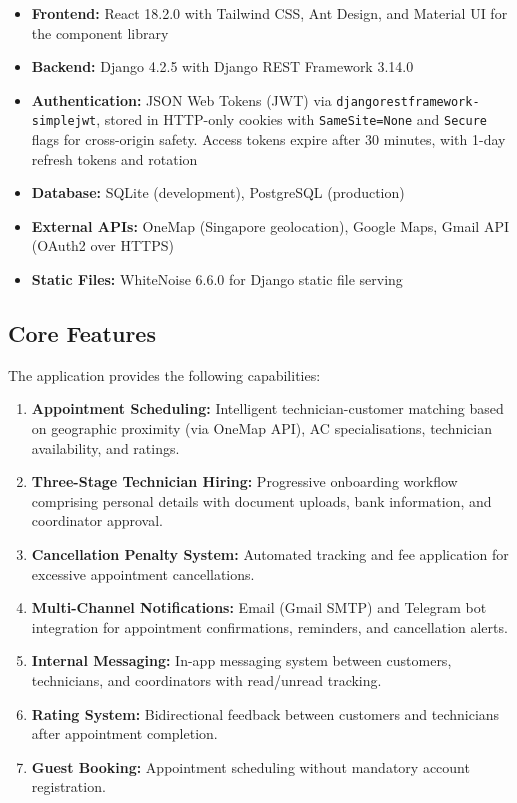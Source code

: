 \documentclass[conference]{IEEEtran}
\begin{document}
\begin{itemize}
    \item \textbf{Frontend:} React 18.2.0 with Tailwind CSS, Ant Design, and Material UI for the component library
    \item \textbf{Backend:} Django 4.2.5 with Django REST Framework 3.14.0
    \item \textbf{Authentication:} JSON Web Tokens (JWT) via \texttt{djangorestframework-\allowbreak simplejwt}, stored in HTTP-only cookies with \texttt{SameSite=None} and \texttt{Secure} flags for cross-origin safety. Access tokens expire after 30 minutes, with 1-day refresh tokens and rotation
    \item \textbf{Database:} SQLite (development), PostgreSQL (production)
    \item \textbf{External APIs:} OneMap (Singapore geolocation), Google Maps, Gmail API (OAuth2 over HTTPS)
    \item \textbf{Static Files:} WhiteNoise 6.6.0 for Django static file serving
\end{itemize}

\subsection{Core Features}

The application provides the following capabilities:

\begin{enumerate}
    \item \textbf{Appointment Scheduling:} Intelligent technician-customer matching based on geographic proximity (via OneMap API), AC specialisations, technician availability, and ratings.
    \item \textbf{Three-Stage Technician Hiring:} Progressive onboarding workflow comprising personal details with document uploads, bank information, and coordinator approval.
    \item \textbf{Cancellation Penalty System:} Automated tracking and fee application for excessive appointment cancellations.
    \item \textbf{Multi-Channel Notifications:} Email (Gmail SMTP) and Telegram bot integration for appointment confirmations, reminders, and cancellation alerts.
    \item \textbf{Internal Messaging:} In-app messaging system between customers, technicians, and coordinators with read/unread tracking.
    \item \textbf{Rating System:} Bidirectional feedback between customers and technicians after appointment completion.
    \item \textbf{Guest Booking:} Appointment scheduling without mandatory account registration.
\end{enumerate}
\end{document}
